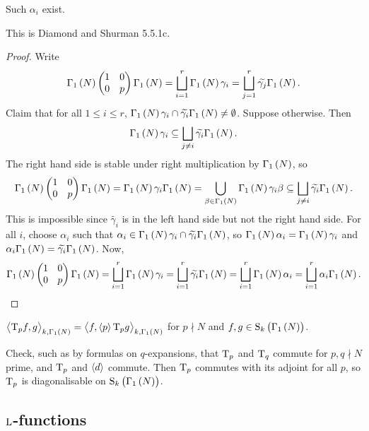 \begin{lemma}
Such $ \alpha_i $ exist.
\end{lemma}

This is Diamond and Shurman 5.5.1c.

\begin{proof}
Write
$$ \Gamma_1\br{N}\twobytwo{1}{0}{0}{p}\Gamma_1\br{N} = \bigsqcup_{i = 1}^r \Gamma_1\br{N}\gamma_i = \bigsqcup_{j = 1}^r \widetilde{\gamma_j}\Gamma_1\br{N}. $$
Claim that for all $ 1 \le i \le r $, $ \Gamma_1\br{N}\gamma_i \cap \widetilde{\gamma_i}\Gamma_1\br{N} \ne \emptyset $. Suppose otherwise. Then
$$ \Gamma_1\br{N}\gamma_i \subseteq \bigsqcup_{j \ne i} \widetilde{\gamma_i}\Gamma_1\br{N}. $$
The right hand side is stable under right multiplication by $ \Gamma_1\br{N} $, so
$$ \Gamma_1\br{N}\twobytwo{1}{0}{0}{p}\Gamma_1\br{N} = \Gamma_1\br{N}\gamma_i\Gamma_1\br{N} = \bigcup_{\beta \in \Gamma_1\br{N}} \Gamma_1\br{N}\gamma_i\beta \subseteq \bigsqcup_{j \ne i} \widetilde{\gamma_i}\Gamma_1\br{N}. $$
This is impossible since $ \widetilde{\gamma_i} $ is in the left hand side but not the right hand side. For all $ i $, choose $ \alpha_i $ such that $ \alpha_i \in \Gamma_1\br{N}\gamma_i \cap \widetilde{\gamma_i}\Gamma_1\br{N} $, so $ \Gamma_1\br{N}\alpha_i = \Gamma_1\br{N}\gamma_i $ and $ \alpha_i\Gamma_1\br{N} = \widetilde{\gamma_i}\Gamma_1\br{N} $. Now,
$$ \Gamma_1\br{N}\twobytwo{1}{0}{0}{p}\Gamma_1\br{N} = \bigsqcup_{i = 1}^r \Gamma_1\br{N}\gamma_i = \bigsqcup_{i = 1}^r \widetilde{\gamma_i}\Gamma_1\br{N} = \bigsqcup_{i = 1}^r \Gamma_1\br{N}\alpha_i = \bigsqcup_{i = 1}^r \alpha_i\Gamma_1\br{N}. $$
\end{proof}

\begin{corollary}
$ \abr{\T_pf, g}_{k, \Gamma_1\br{N}} = \abr{f, \abr{p}\T_pg}_{k, \Gamma_1\br{N}} $ for $ p \nmid N $ and $ f, g \in \S_k\br{\Gamma_1\br{N}} $.
\end{corollary}

Check, such as by formulas on $ q $-expansions, that $ \mathrm{T}_p $ and $ \mathrm{T}_q $ commute for $ p, q \nmid N $ prime, and $ \mathrm{T}_p $ and $ \left\langle d \right\rangle $ commute. Then $ \mathrm{T}_p $ commutes with its adjoint for all $ p $, so $ \mathrm{T}_p $ is diagonalisable on $ \S_k\br{\Gamma_1\br{N}} $.

\pagebreak

\subsection{\texorpdfstring{$ \mathrm{L} $}{L}-functions}

